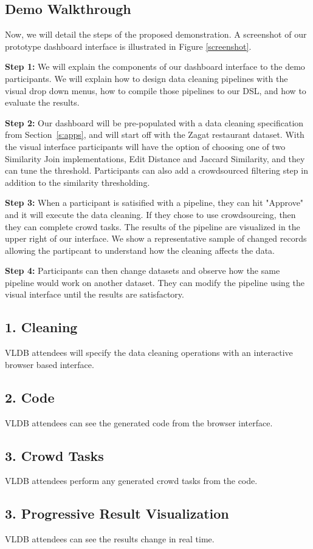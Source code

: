 \subsection{Demo Walkthrough}
Now, we will detail the steps of the proposed demonstration.
A screenshot of our prototype dashboard interface is illustrated in Figure \ref{screenshot}.

\vspace{0.5em}

\noindent\textbf{Step 1: } We will explain the components of our dashboard interface to the
demo participants. We will explain how to design data cleaning pipelines with the visual 
drop down menus, how to compile those pipelines to our DSL, and how to evaluate the results.

\vspace{0.5em}

\noindent\textbf{Step 2: } Our dashboard will be pre-populated with a data cleaning specification from Section~\ref{s:apps}, and will
start off with the Zagat restaurant dataset. With the visual interface participants will have the option of choosing one of two Similarity Join implementations, Edit Distance and Jaccard Similarity, and they can tune the threshold.
Participants can also add a crowdsourced filtering step in addition to the similarity thresholding. 

\vspace{0.5em}

\noindent\textbf{Step 3: } When a participant is satisified with a pipeline, they can hit "Approve" and it will execute the data cleaning. If they chose to use crowdsourcing, then they can complete crowd tasks. The results of the pipeline are visualized in the upper right of our interface.
We show a representative sample of changed records allowing the partipcant to understand how the cleaning affects the data. 

\vspace{0.5em}

\noindent\textbf{Step 4: } Participants can then change datasets and observe how the same pipeline would work on another dataset.
They can modify the pipeline using the visual interface until the results are satisfactory.

\subsection{1. Cleaning}
VLDB attendees will specify the data cleaning operations with an interactive browser based
interface. 

\subsection{2. Code}
VLDB attendees can see the generated code from the browser interface.

\subsection{3. Crowd Tasks}
VLDB attendees perform any generated crowd tasks from the code.  

\subsection{3. Progressive Result Visualization}
VLDB attendees can see the results change in real time.  
\fi
